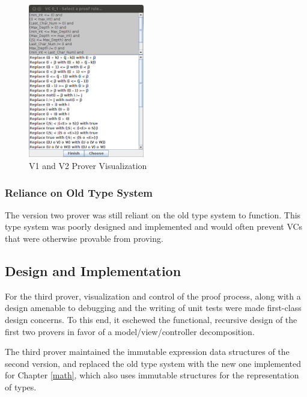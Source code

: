 \begin{figure}
  \centering
    \includegraphics[width=0.45\textwidth]{proverDebugMode}
  \caption{V1 and V2 Prover Visualization\label{proverDebugMode}}
\end{figure}

		\subsubsection{Reliance on Old Type System}

The version two prover was still reliant on the old type system to function.  This type system was poorly designed and implemented and would often prevent VCs that were otherwise provable from proving.

	\subsection{Design and Implementation}

For the third prover, visualization and control of the proof process, along with a design amenable to debugging and the writing of unit tests were made first-class design concerns.  To this end, it eschewed the functional, recursive design of the first two provers in favor of a model/view/controller decomposition.

The third prover maintained the immutable expression data structures of the second version, and replaced the old type system with the new one implemented for Chapter \ref{math}, which also uses immutable structures for the representation of types.

